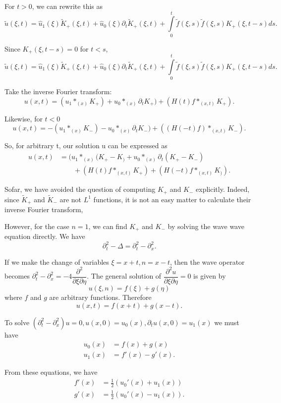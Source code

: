 For $t > 0$, we can rewrite this as 
$$
\tilde{u} (\xi, t) = \hat{u}_1 (\xi) \tilde{K}_+ (\xi, t ) +
\hat{u}_0 (\xi) \partial_t \tilde{K}_+ (\xi, t) + \int \limits^t_0
\tilde{f} (\xi, s) \tilde{f}(\xi, s ) K_+ (\xi, t-s) ds. 
$$

Since $K_+ (\xi, t -s) = 0 $ for $t < s$,
$$
\tilde{u} (\xi, t) = \hat{u}_1 (\xi) \tilde{K}_+ (\xi, t ) +
\hat{u}_0 (\xi) \partial_t \tilde{K}_+ (\xi, t) + \int \limits^t_0
\tilde{f} (\xi, s) \tilde{f}(\xi, s ) K_+ (\xi, t-s) ds. 
$$

Take the inverse Fourier transform:
$$
u(x,t) = (u_1 *_{(x)} K_+) + u_0 *_{(x)} \partial_t K_+) + (H(t)f *_{(x,t)} K_+).
$$

Likewise, for $t<0$
$$
u(x,t) = -(u_1 *_{(x)} K_-) - u_0 *_{(x)} \partial_t K_-) + ((H(-t)f)
*_{(x,t)} K_-). 
$$

So, for arbitrary t, our solution u can be expressed as
\begin{align*}
  u(x,t) &= (u_1 *_{(x)} (K_+ - K_) + u_0 *_{(x)}
    \partial_t (K_+ - K_-)\\
&\qquad + (H(t) f *_{(x,t)} K_+ ) + (H(-t) f
    *_{(x,t)} K_ )). \tag{2.38}\label{chap2:sec6:eq2.38}
\end{align*}

So\pageoriginale far, we have avoided the question of computing $K_+$ and $K_-$
explicitly. Indeed, since $\tilde{K}_+$ and $\tilde{K}_-$ are not
$L^1$ functions, it is not an easy matter to calculate their inverse
Fourier transform, 

However, for the case $n=1$, we can find $K_+$ and $K_-$ by solving
the wave wave equation directly. We have  
$$
\partial^2_t - \Delta = \partial^2_t - \partial^2_x.
$$

 If we make the change of variables $\xi = x + t, n = x - t$, then the
 wave operator becomes $\partial^2_t - \partial^2_x = -4
 \dfrac{\partial^2}{\partial \xi \partial \eta}$. The general solution of
 $\dfrac{\partial^2u}{\partial \xi \partial \eta} = 0$ is given by 
 $$
 u(\xi, n ) = f(\xi) + g(\eta)
 $$
 where $f$ and $g$ are arbitrary functions. Therefore
 $$
 u(x,t) = f(x + t) + g(x - t).
 $$
 
 
 To solve $(\partial^2_t - \partial^2_x) u = 0, u(x,0) = u_0(x),
 \partial_t u (x,0) = u_1(x)$ we must have 
 \begin{align*}
   u_0(x) & = f(x) + g(x) \\
   u_1(x) & = f'(x) - g'(x). 
 \end{align*}  
 
 From these equations, we have
 \begin{align*}
   f'(x) & = \frac{1}{2}(u_0'(x) + u_1(x)) \\
   g'(x) & = \frac{1}{2}(u_0'(x) - u_1(x)). 
 \end{align*} 

